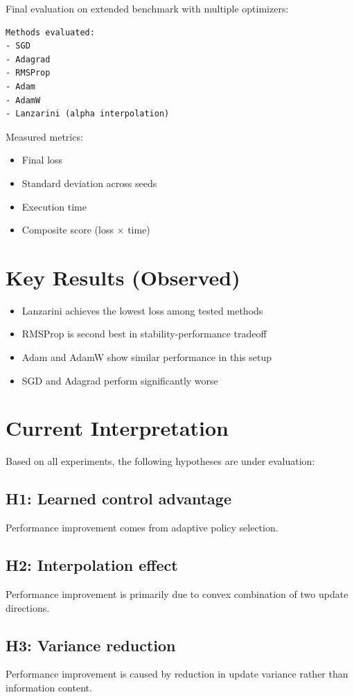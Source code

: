 \documentclass{article}
\begin{document}
Final evaluation on extended benchmark with multiple optimizers:

\begin{verbatim}
Methods evaluated:
- SGD
- Adagrad
- RMSProp
- Adam
- AdamW
- Lanzarini (alpha interpolation)
\end{verbatim}

Measured metrics:
\begin{itemize}
    \item Final loss
    \item Standard deviation across seeds
    \item Execution time
    \item Composite score (loss × time)
\end{itemize}

\section{Key Results (Observed)}

\begin{itemize}
    \item Lanzarini achieves the lowest loss among tested methods
    \item RMSProp is second best in stability-performance tradeoff
    \item Adam and AdamW show similar performance in this setup
    \item SGD and Adagrad perform significantly worse
\end{itemize}

\section{Current Interpretation}

Based on all experiments, the following hypotheses are under evaluation:

\subsection{H1: Learned control advantage}
Performance improvement comes from adaptive policy selection.

\subsection{H2: Interpolation effect}
Performance improvement is primarily due to convex combination of two update directions.

\subsection{H3: Variance reduction}
Performance improvement is caused by reduction in update variance rather than information content.
\end{document}
